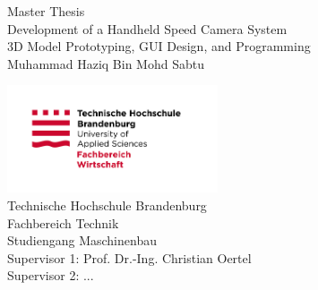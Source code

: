 \begin{titlepage}
    \begin{center}

        \vspace*{20mm}
        {\normalsize Master Thesis}\\[2mm]
        {\large \normalfont Development of a Handheld Speed Camera System\\[2mm]\small \normalfont  3D Model Prototyping, GUI Design, and Programming}
        \\[5mm]

        \large Muhammad Haziq Bin Mohd Sabtu

        \vspace*{12mm}
        \small


        \vspace*{10mm}
        \includegraphics[height=120px]{texs/pre/image/2015_10_05_THB_FB-W_Logo_RGB.jpg}\\
        \small
        Technische Hochschule Brandenburg\\
        Fachbereich Technik\\
        Studiengang Maschinenbau\\
        Supervisor 1: Prof. Dr.-Ing. Christian Oertel\\
        Supervisor 2: ...\\

    \end{center}
\end{titlepage}